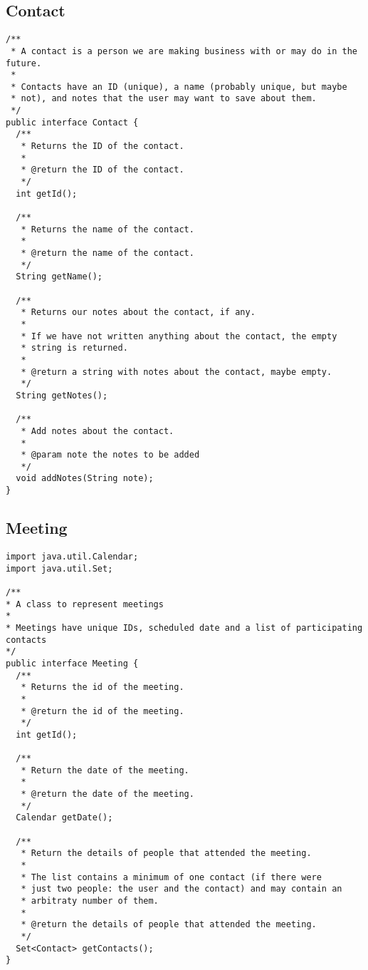 \documentclass{article}
\begin{document}
\subsection{Contact}
\label{sec:contact}

\begin{verbatim}
/**
 * A contact is a person we are making business with or may do in the future. 
 * 
 * Contacts have an ID (unique), a name (probably unique, but maybe
 * not), and notes that the user may want to save about them. 
 */
public interface Contact {
  /**
   * Returns the ID of the contact.
   *
   * @return the ID of the contact.
   */
  int getId();

  /**
   * Returns the name of the contact.
   * 
   * @return the name of the contact.
   */
  String getName();

  /**
   * Returns our notes about the contact, if any. 
   * 
   * If we have not written anything about the contact, the empty
   * string is returned. 
   * 
   * @return a string with notes about the contact, maybe empty.
   */
  String getNotes();

  /**
   * Add notes about the contact.
   * 
   * @param note the notes to be added
   */
  void addNotes(String note);
}
\end{verbatim}

\subsection{Meeting}
\label{sec:meeting}

\begin{verbatim}
import java.util.Calendar;
import java.util.Set;

/**
* A class to represent meetings
*
* Meetings have unique IDs, scheduled date and a list of participating contacts
*/
public interface Meeting {
  /**
   * Returns the id of the meeting.
   * 
   * @return the id of the meeting.
   */
  int getId();

  /**
   * Return the date of the meeting.
   * 
   * @return the date of the meeting.
   */
  Calendar getDate();

  /**
   * Return the details of people that attended the meeting.
   * 
   * The list contains a minimum of one contact (if there were 
   * just two people: the user and the contact) and may contain an 
   * arbitraty number of them.
   * 
   * @return the details of people that attended the meeting.
   */
  Set<Contact> getContacts();
}
\end{verbatim}
\end{document}
